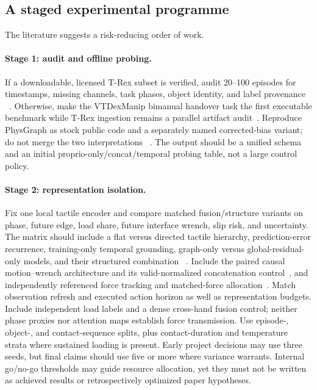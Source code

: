 \subsection{A staged experimental programme}

The literature suggests a risk-reducing order of work.

\paragraph{Stage 1: audit and offline probing.}
If a downloadable, licensed T-Rex subset is verified, audit 20--100 episodes for
timestamps, missing channels, task phases, object identity, and label provenance
~\cite{niu2026trex}. Otherwise, make the VTDexManip bimanual handover task the
first executable benchmark while T-Rex ingestion remains a parallel artifact
audit~\cite{liu2025vtdexmanip}. Reproduce PhysGraph as stock public code and a separately
named corrected-bias variant; do not merge the two interpretations
~\cite{li2026physgraph}. The output should be a unified schema and an initial
proprio-only/concat/temporal probing table, not a large control policy.

\paragraph{Stage 2: representation isolation.}
Fix one local tactile encoder and compare matched fusion/structure variants on
phase, future edge, load share, future interface wrench, slip risk, and
uncertainty. The matrix should include a flat versus directed tactile hierarchy,
prediction-error recurrence, training-only temporal grounding, graph-only versus
global-residual-only models, and their structured combination
~\cite{xue2026hitacwam,wang2026meshpriordit,yang2026temporalflowvla,sawada2026predvla}.
Include the paired causal motion--wrench architecture and its valid-normalized
concatenation control~\cite{update2026cwwam}, and independently referenced force
tracking and matched-force allocation~\cite{update2026flore,update2026keepingcontact}.
Match observation refresh and executed action horizon as well
as representation budgets. Include independent load labels and a dense cross-hand
fusion control; neither phase proxies nor attention maps establish force transmission.
Use episode-, object-, and contact-sequence splits, plus contact-duration and
temperature strata where sustained loading is present. Early project
decisions may use three seeds, but final claims should use five or more where
variance warrants. Internal go/no-go thresholds may guide resource allocation,
yet they must not be written as achieved results or retrospectively optimized
paper hypotheses.

